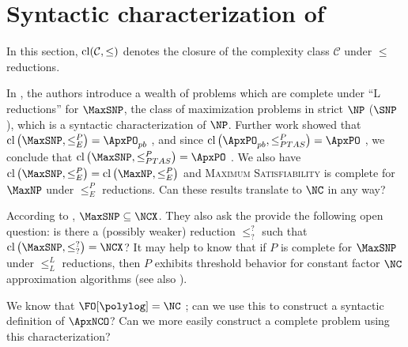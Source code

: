 

\section{Syntactic characterization of \texorpdfstring{\ApxNCO}{ApxNCO}}

In this section, $\operatorname{cl}(\mathcal{C}, \leq)$ denotes the closure of the complexity class $\mathcal{C}$ under $\leq$ reductions.

In \cite{py91}, the authors introduce a wealth of problems which are complete under ``L reductions'' for $\MaxSNP$, the class of maximization problems in strict $\NP$ ($\SNP$), which is a syntactic characterization of $\NP$.
Further work showed that $\cl\left(\MaxSNP, \leq^P_E\right) = \ApxPO_{pb}$ \cite[Theorem~1]{kmsv99}, and since $\cl\left(\ApxPO_{pb}, \leq^P_{PTAS}\right) = \ApxPO$ \cite{ct00}, we conclude that $\cl\left(\MaxSNP, \leq^P_{PTAS}\right) = \ApxPO$ \cite{kmsv99}.
We also have $\cl\left(\MaxSNP, \leq^P_E\right) = \cl\left(\MaxNP, \leq^P_E\right)$ \cite[Theorem~2]{kmsv99} and \textsc{Maximum Satisfiability} is complete for $\MaxNP$ under $\leq^P_E$ reductions.
Can these results translate to $\NC$ in any way?

According to \cite[Theorem~9.1.3]{dsst97}, $\MaxSNP \subseteq \NCX$.
They also ask the provide the following open question: is there a (possibly weaker) reduction $\leq^?_?$ such that $\cl\left(\MaxSNP, \leq^?_?\right) = \NCX$?
It may help to know that if $P$ is complete for $\MaxSNP$ under $\leq^L_L$ reductions, then $P$ exhibits threshold behavior for constant factor $\NC$ approximation algorithms \cite[Theorem~9]{sx95} (see also \cite[Theorem~9.2.3]{dsst97}).

\begin{todo}
  We know that $\FO[\polylog] = \NC$ \cite[Theorem~5.2]{immerman99}; can we use this to construct a syntactic definition of $\ApxNCO$?
  Can we more easily construct a complete problem using this characterization?
\end{todo}

